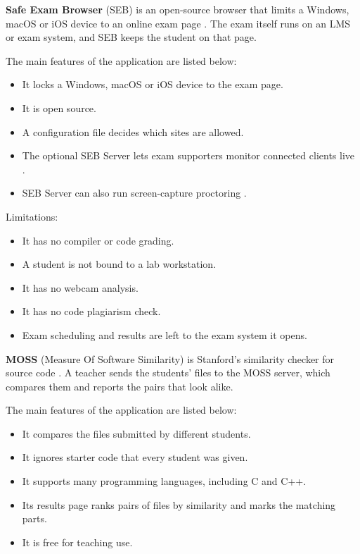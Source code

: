 \noindent\textbf{Safe Exam Browser} (SEB) is an open-source browser that limits a Windows, macOS or iOS device to an online exam page \cite{seb1}. The exam itself runs on an LMS or exam system, and SEB keeps the student on that page.

\noindent The main features of the application are listed below:
\begin{itemize}[noitemsep]
\item It locks a Windows, macOS or iOS device to the exam page.
\item It is open source.
\item A configuration file decides which sites are allowed.
\item The optional SEB Server lets exam supporters monitor connected clients live \cite{sebserver1}.
\item SEB Server can also run screen-capture proctoring \cite{sebserver1}.
\end{itemize}

\noindent Limitations:
\begin{itemize}[noitemsep]
\item It has no compiler or code grading.
\item A student is not bound to a lab workstation.
\item It has no webcam analysis.
\item It has no code plagiarism check.
\item Exam scheduling and results are left to the exam system it opens.
\end{itemize}

\noindent\textbf{MOSS} (Measure Of Software Similarity) is Stanford's similarity checker for source code \cite{moss1}. A teacher sends the students' files to the MOSS server, which compares them and reports the pairs that look alike.

\noindent The main features of the application are listed below:
\begin{itemize}[noitemsep]
\item It compares the files submitted by different students.
\item It ignores starter code that every student was given.
\item It supports many programming languages, including C and C++.
\item Its results page ranks pairs of files by similarity and marks the matching parts.
\item It is free for teaching use.
\end{itemize}

